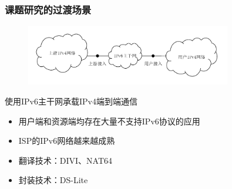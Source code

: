 \documentclass{beamer}
\begin{document}
\begin{frame}
  \frametitle{课题研究的过渡场景}

  \begin{figure}
    \includegraphics[width=0.8\textwidth]{figs/1-464.pdf}
  \end{figure}

  \begin{block}{使用IPv6主干网承载IPv4端到端通信}
    \begin{itemize}
    \item 用户端和资源端均存在大量不支持IPv6协议的应用
    \item ISP的IPv6网络越来越成熟
    \item 翻译技术：DIVI、NAT64
    \item 封装技术：DS-Lite
    \end{itemize}
  \end{block}
\end{frame}
\end{document}
